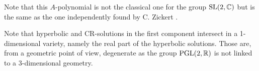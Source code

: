 Note that this $A$-polynomial is not the classical one for the group
$\operatorname{SL} (2,\mathbb{C})$ but is the same as the one independently found by
C. Zickert {\cite{Zickert-A-pol}}.

Note that hyperbolic and CR-solutions in the first component intersect in a
1-dimensional variety, namely the real part of the hyperbolic solutions. Those
are, from a geometric point of view, degenerate as the group $\operatorname{PGL}
(2,\mathbb{R})$ is not linked to a 3-dimensional geometry.
